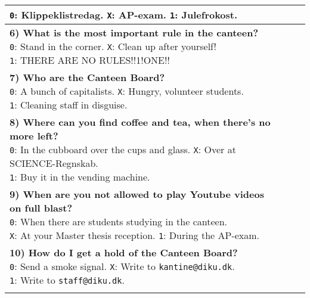 \begin{center}
\begin{tabular}{|p{12cm}|p{0.2cm}|p{0.2cm}|p{0.2cm}|}
{  \texttt{0}: Klippeklistredag. \quad
  \texttt{X}: AP-exam. \quad
  \texttt{1}: Julefrokost.
  \vspace{0.1cm}
} & & & \\\hline
\parbox{12cm}{
  \vspace{0.2cm}
  \textbf{6) What is the most important rule in the canteen?} \\
  \texttt{0}: Stand in the corner. \quad
  \texttt{X}: Clean up after yourself! \\
  \texttt{1}: THERE ARE NO RULES!!1!ONE!!
  \vspace{0.1cm}
} & & & \\\hline
\parbox{12cm}{
  \vspace{0.2cm}
  \textbf{7) Who are the Canteen Board?} \\
  \texttt{0}: A bunch of capitalists. \quad
  \texttt{X}: Hungry, volunteer students. \\
  \texttt{1}: Cleaning staff in disguise.
  \vspace{0.1cm}
} & & & \\\hline
\parbox{12cm}{
  \vspace{0.2cm}
  \textbf{8) Where can you find coffee and tea, when there's no more
  left?} \\
  \texttt{0}: In the cubboard over the cups and glass. \quad
  \texttt{X}: Over at SCIENCE-Regnskab. \\
  \texttt{1}: Buy it in the vending machine.
  \vspace{0.1cm}
} & & & \\\hline
\parbox{12cm}{
  \vspace{0.2cm}
  \textbf{9) When are you not allowed to play Youtube videos on full
  blast?} \\
  \texttt{0}: When there are students studying in the canteen. \\
  \texttt{X}: At your Master thesis reception. \quad
  \texttt{1}: During the AP-exam.
  \vspace{0.1cm}
} & & & \\\hline
\parbox{12cm}{
  \vspace{0.2cm}
  \textbf{10) How do I get a hold of the Canteen Board?} \\
  \texttt{0}: Send a smoke signal. \quad
  \texttt{X}: Write to \texttt{kantine@diku.dk}. \\
  \texttt{1}: Write to \texttt{staff@diku.dk}.
  \vspace{0.1cm}
} & & & \\\hline
\parbox{12cm}{
  \vspace{0.2cm}
}
\end{tabular}
\end{center}
